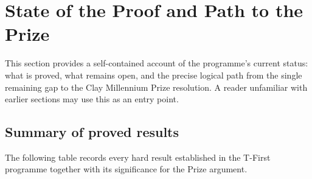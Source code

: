 \documentclass[11pt]{article}
\theoremstyle{definition}
\theoremstyle{remark}
\begin{document}
\section{State of the Proof and Path to the Prize}
\label{sec:state-of-proof}

This section provides a self-contained account of the programme's current
status: what is proved, what remains open, and the precise logical path
from the single remaining gap to the Clay Millennium Prize resolution.
A reader unfamiliar with earlier sections may use this as an entry point.

\subsection{Summary of proved results}
\label{sec:proved-summary}

The following table records every hard result established in the T-First
programme together with its significance for the Prize argument.
\end{document}
